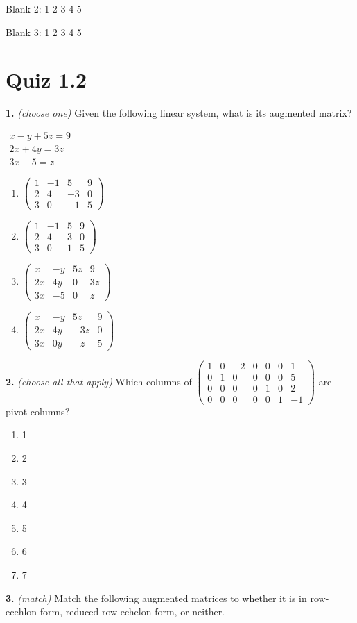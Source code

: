 \documentclass[10pt,a4paper]{article}
\begin{document}
\quad Blank 2: 1 \textbar{} 2 \textbar{} 3 \textbar{} 4 \textbar{} 5

\quad Blank 3: 1 \textbar{} 2 \textbar{} 3 \textbar{} 4 \textbar{} 5

\smallskip
\section{Quiz 1.2}
\textbf{1.} \textit{(choose one)} Given the following linear system, what is its augmented matrix?

\(\begin{array}{c}x-y+5z=9\\2x+4y=3z\\3x-5=z\end{array}\)

\begin{enumerate}[label=(\Alph*)]
\item \(\left(\begin{array}{ccc|c}1&-1&5&9\\2&4&-3&0\\3&0&-1&5\end{array}\right)\)
\item \(\left(\begin{array}{ccc|c}1&-1&5&9\\2&4&3&0\\3&0&1&5\end{array}\right)\)
\item \(\left(\begin{array}{ccc|c}x&-y&5z&9\\2x&4y&0&3z\\3x&-5&0&z\end{array}\right)\)
\item \(\left(\begin{array}{ccc|c}x&-y&5z&9\\2x&4y&-3z&0\\3x&0y&-z&5\end{array}\right)\)
\end{enumerate}
\smallskip
\textbf{2.} \textit{(choose all that apply)} Which columns of \(\left(\begin{array}{cccccc|c}1&0&-2&0&0&0&1\\0&1&0&0&0&0&5\\0&0&0&0&1&0&2\\0&0&0&0&0&1&-1\end{array}\right)\) are pivot columns?

\begin{enumerate}[label=(\Alph*)]
\item 1
\item 2
\item 3
\item 4
\item 5
\item 6
\item 7
\end{enumerate}
\smallskip
\textbf{3.} \textit{(match)} Match the following augmented matrices to whether it is in row-ecehlon form, reduced row-echelon form, or neither.
\end{document}

